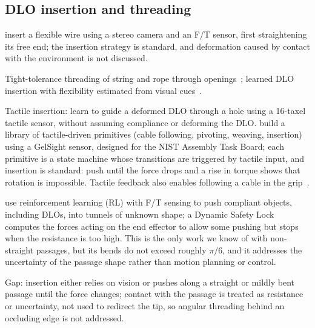 \subsection{DLO insertion and threading}
\begin{outline}
  \item \citet{nkot-sditfw-97} insert a flexible wire using a stereo camera and
    an F/T sensor, first straightening its free end; the insertion strategy is
    standard, and deformation caused by contact with the environment is not
    discussed.
  \item Tight-tolerance threading of string and rope through
    openings~\cite{wang2015online}; learned DLO insertion with flexibility
    estimated from visual cues~\cite{lc-ldloilfevc-24}.
  \item Tactile insertion: \citet{zdpp-dhattfmn-19} learn to guide a deformed
    DLO through a hole using a 16-taxel tactile sensor, without assuming
    compliance or deforming the DLO. \citet{wjly-cratmp-22} build a library of
    tactile-driven primitives (cable following, pivoting, weaving, insertion)
    using a GelSight sensor, designed for the NIST Assembly Task Board; each
    primitive is a state machine whose transitions are triggered by tactile
    input, and insertion is standard: push until the force drops and a rise in
    torque shows that rotation is impossible. Tactile feedback also enables
    following a cable in the grip~\cite{she2021cable}.
  \item \citet{lvw-crcrisb-24} use reinforcement learning (RL) with F/T sensing
    to push compliant objects, including DLOs, into tunnels of unknown shape; a
    Dynamic Safety Lock computes the forces acting on the end effector to allow
    some pushing but stops when the resistance is too high. This is the only
    work we know of with non-straight passages, but its bends do not exceed
    roughly $\pi/6$, and it addresses the uncertainty of the passage shape
    rather than motion planning or control.
  \item Gap: insertion either relies on vision or pushes along a straight or
    mildly bent passage until the force changes; contact with the passage is
    treated as resistance or uncertainty, not used to redirect the tip, so
    angular threading behind an occluding edge is not addressed.
\end{outline}

